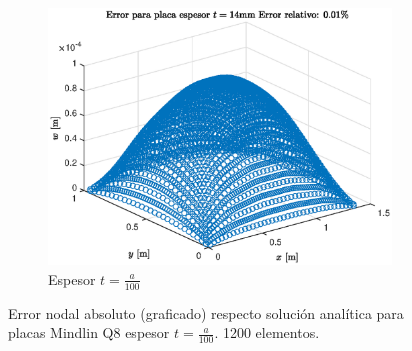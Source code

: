 \documentclass[onecolumn,10pt,titlepage]{article}
\begin{document}
\begin{figure}[htb!]
\begin{subfigure}{.33\textwidth}
   \includegraphics[width=\linewidth]{fig/t100_Error.eps}
   \caption{Espesor $t=\frac{a}{100}$}
 \end{subfigure}
 \caption{Error nodal absoluto (graficado) respecto solución analítica para placas Mindlin Q8 espesor $t=\frac{a}{100}$. 1200 elementos.}
 \label{fig:Minderror}
 \end{figure}
\end{document}
